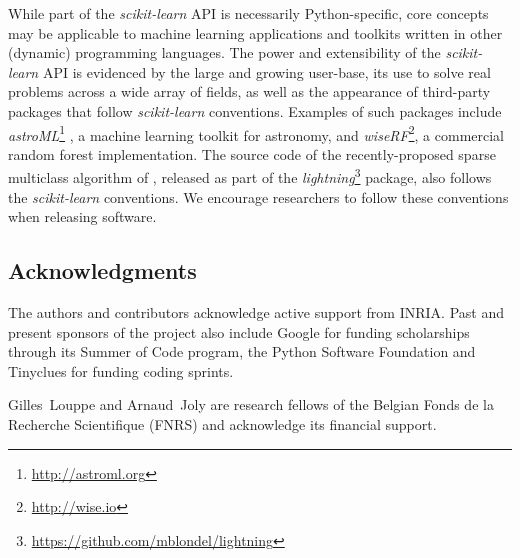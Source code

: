 \documentclass[twocolumn]{article}
\newcommand{\sklearn}{\textit{scikit-learn}\xspace}
\DeclareRobustCommand{\VAN}[3]{#2}
\begin{document}
While part of the \sklearn API is necessarily Python-specific,
core concepts may be applicable to
machine learning applications and toolkits
written in other (dynamic) programming languages.
The power and extensibility of the \sklearn API is evidenced
by the large and growing user-base, its use to solve real
problems across a wide array of fields,
as well as the appearance of third-party packages
that follow \sklearn conventions. Examples of such packages include
\textit{astroML}\footnote{\url{http://astroml.org}}
\citep{vanderplas2012astroML}, a machine learning toolkit for astronomy,
and \textit{wiseRF}\footnote{\url{http://wise.io}}, a commercial random forest
implementation. The source code of the recently-proposed sparse multiclass
algorithm of \citet{mblondel-mlj2013}, released as part of the
\textit{lightning}\footnote{\url{https://github.com/mblondel/lightning}}
package, also follows the \sklearn conventions.
We encourage researchers to follow these conventions when releasing software.

\subsection*{Acknowledgments}

The authors and contributors acknowledge active support from INRIA\@. Past and
present sponsors of the project also include Google for funding
scholarships through its Summer of Code program,
the Python Software Foundation and Tinyclues for funding coding sprints.

Gilles~Louppe and Arnaud~Joly are research fellows of the Belgian
Fonds de la Recherche Scientifique (FNRS)
and acknowledge its financial support.

{\small

\setlength{\bibsep}{1mm}
\DeclareRobustCommand{\VAN}[3]{#3}

}
\end{document}
